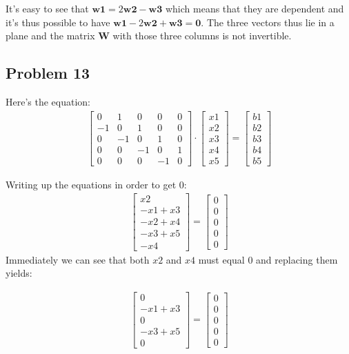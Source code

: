 \documentclass[a4paper,11pt]{article}
\newcommand{\mybf}[1]{\boldsymbol{#1}}
\begin{document}
  It's easy to see that $\mybf{w1}=2\mybf{w2}-\mybf{w3}$ which means that they are dependent and it's thus possible to have $\mybf{w1}-2\mybf{w2}+\mybf{w3}=\mybf{0}$. The three vectors thus lie in a plane and the matrix $\mybf{W}$ with those three columns is not invertible.
  
\subsection*{Problem 13}
Here's the equation:
\begin{align}
\begin{bmatrix}
0  & 1  & 0  & 0  & 0 \\
-1 & 0  & 1  & 0  & 0 \\
0  & -1 & 0  & 1  & 0 \\
0  & 0  & -1 & 0  & 1 \\
0  & 0  & 0  & -1 & 0 
\end{bmatrix}
\cdot
\begin{bmatrix}
x1  \\
x2 \\
x3 \\
x4 \\
x5 
\end{bmatrix}
=
\begin{bmatrix}
b1  \\
b2 \\
b3 \\
b4 \\
b5 
\end{bmatrix}
\end{align}

Writing up the equations in order to get 0:
\begin{align}
\begin{bmatrix}
x2 \\
-x1+x3 \\
-x2+x4 \\
-x3+x5 \\
-x4 
\end{bmatrix}
=
\begin{bmatrix}
0  \\
0 \\
0 \\
0 \\
0 
\end{bmatrix}
\end{align}
Immediately we can see that both $x2$ and $x4$ must equal 0 and replacing them yields:

\begin{align}
\begin{bmatrix}
0 \\
-x1+x3 \\
0 \\
-x3+x5 \\
0
\end{bmatrix}
=
\begin{bmatrix}
0  \\
0 \\
0 \\
0 \\
0 
\end{bmatrix}
\end{align}
\end{document}
